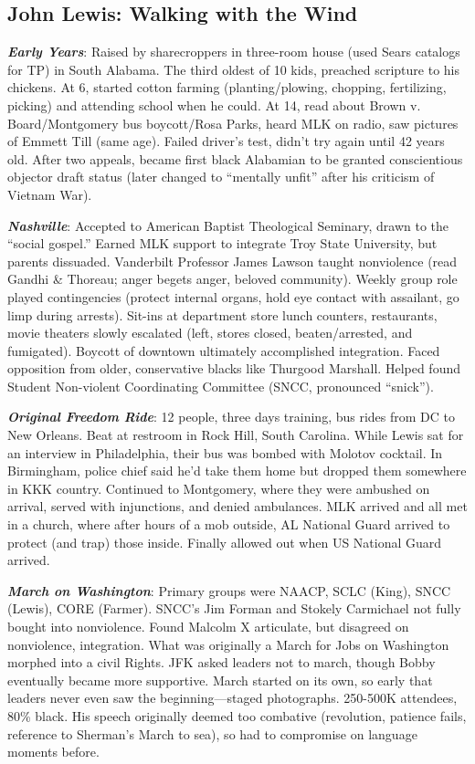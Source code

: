 \documentclass[
]{article}
\begin{document}
\hypertarget{john-lewis-walking-with-the-wind}{%
\subsection{John Lewis: Walking with the
Wind}\label{john-lewis-walking-with-the-wind}}

\textbf{\emph{Early Years}}: Raised by sharecroppers in three-room house
(used Sears catalogs for TP) in South Alabama. The third oldest of 10
kids, preached scripture to his chickens. At 6, started cotton farming
(planting/plowing, chopping, fertilizing, picking) and attending school
when he could. At 14, read about Brown v. Board/Montgomery bus
boycott/Rosa Parks, heard MLK on radio, saw pictures of Emmett Till
(same age). Failed driver's test, didn't try again until 42 years old.
After two appeals, became first black Alabamian to be granted
conscientious objector draft status (later changed to ``mentally unfit''
after his criticism of Vietnam War).

\textbf{\emph{Nashville}}: Accepted to American Baptist Theological
Seminary, drawn to the ``social gospel.'' Earned MLK support to
integrate Troy State University, but parents dissuaded. Vanderbilt
Professor James Lawson taught nonviolence (read Gandhi \& Thoreau; anger
begets anger, beloved community). Weekly group role played contingencies
(protect internal organs, hold eye contact with assailant, go limp
during arrests). Sit-ins at department store lunch counters,
restaurants, movie theaters slowly escalated (left, stores closed,
beaten/arrested, and fumigated). Boycott of downtown ultimately
accomplished integration. Faced opposition from older, conservative
blacks like Thurgood Marshall. Helped found Student Non-violent
Coordinating Committee (SNCC, pronounced ``snick'').

\textbf{\emph{Original Freedom Ride}}: 12 people, three days training,
bus rides from DC to New Orleans. Beat at restroom in Rock Hill, South
Carolina. While Lewis sat for an interview in Philadelphia, their bus
was bombed with Molotov cocktail. In Birmingham, police chief said he'd
take them home but dropped them somewhere in KKK country. Continued to
Montgomery, where they were ambushed on arrival, served with
injunctions, and denied ambulances. MLK arrived and all met in a church,
where after hours of a mob outside, AL National Guard arrived to protect
(and trap) those inside. Finally allowed out when US National Guard
arrived.

\textbf{\emph{March on Washington}}: Primary groups were NAACP, SCLC
(King), SNCC (Lewis), CORE (Farmer). SNCC's Jim Forman and Stokely
Carmichael not fully bought into nonviolence. Found Malcolm X
articulate, but disagreed on nonviolence, integration. What was
originally a March for Jobs on Washington morphed into a civil Rights.
JFK asked leaders not to march, though Bobby eventually became more
supportive. March started on its own, so early that leaders never even
saw the beginning---staged photographs. 250-500K attendees, 80\% black.
His speech originally deemed too combative (revolution, patience fails,
reference to Sherman's March to sea), so had to compromise on language
moments before.
\end{document}
